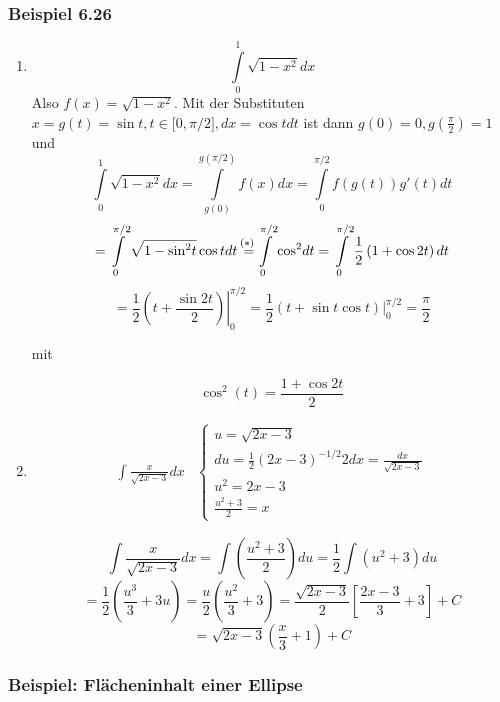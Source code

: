 \begin{enumerate}
\subsubsection*{Beispiel 6.26}
\begin{enumerate}
\item \[\int\limits_0^1 {\sqrt {1 - {x^2}} dx} \] Also $f(x)=\sqrt{1-x^2}$. Mit der Substituten $x=g(t)=\sin t, t\in \lbrack 0,\pi/2\rbrack, dx=\cos tdt$ ist dann $g(0)=0, g\left(\frac{\pi}{2}\right)=1$ und 
\[\int\limits_0^1 {\sqrt {1 - {x^2}} } dx = \int\limits_{g(0)}^{g(\pi /2)} {f(x)dx = \int\limits_0^{\pi /2} {f\left( {g(t)} \right)g'(t)dt} } \]
\[ = \int\limits_0^{\pi /2} {\sqrt {1 - {{\sin }^2}t} \cos tdt\mathop {{\rm{  }} = }\limits^{\text{(\textasteriskcentered )} }} \int\limits_0^{\pi /2} {{{\cos }^2}dt}  = \int\limits_0^{\pi /2} {\frac{1}{2}\left( {1 + \cos 2t} \right)dt} \]
\[ = \left. {\frac{1}{2}\left( {t + \frac{{\sin 2t}}{2}} \right)} \right|_0^{\pi /2} = \frac{1}{2}\left. {\left( {t + \sin t\cos t} \right)} \right|_0^{\pi /2} = \frac{\pi }{2}\]

mit 

\[
{\cos ^2}(t) = \frac{{1 + \cos 2t}}{2} \tag{\textasteriskcentered}
\]


\item \[\begin{array}{*{20}{c}}
{\int {\frac{x}{{\sqrt {2x - 3} }}dx} }&{\left\{ {\begin{array}{*{20}{l}}
{u = \sqrt {2x - 3} }\\
{du = \frac{1}{2}{{\left( {2x - 3} \right)}^{ - 1/2}}2dx = \frac{{dx}}{{\sqrt {2x - 3} }}}\\
{{u^2} = 2x - 3}\\
{\frac{{{u^2} + 3}}{2} = x}
\end{array}} \right.}
\end{array}\]


\[\int {\frac{x}{{\sqrt {2x - 3} }}dx}  = \int {\left( {\frac{{{u^2} + 3}}{2}} \right)} du = \frac{1}{2}\int {({u^2} + 3)du} \]
\[ = \frac{1}{2}\left( {\frac{{{u^3}}}{3} + 3u} \right) = \frac{u}{2}\left( {\frac{{{u^2}}}{3} + 3} \right) = \frac{{\sqrt {2x - 3} }}{2}\left[ {\frac{{2x - 3}}{3} + 3} \right] + C\]
\[ = \sqrt {2x - 3} \left( {\frac{x}{3} + 1} \right) + C\]
\end{enumerate}
\subsubsection*{Beispiel: Flächeninhalt einer Ellipse}


\end{enumerate}
